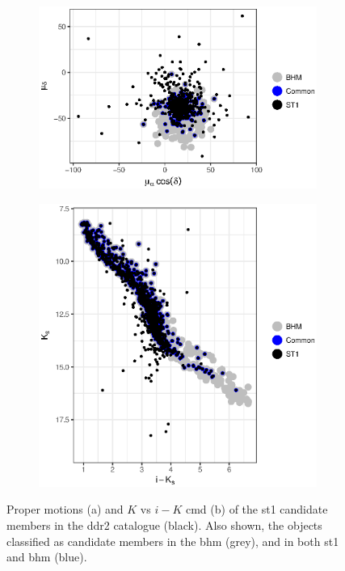 \begin{figure}[ht!]
    \centering
    \begin{subfigure}[t]{0.45\textwidth}
    \centering
       \includegraphics[width=\textwidth]{background/Figures/ST1_pm.eps}
        \caption{}
    \end{subfigure}
    \begin{subfigure}[t]{0.45\textwidth}
    \centering
     \includegraphics[width=\textwidth]{background/Figures/ST1_ph.eps}
        \caption{}
    \end{subfigure}
\caption{Proper motions (a) and $K$ vs $i-K$ \gls{cmd} (b) of the \gls{st1} candidate members in the \gls{ddr2} catalogue (black). Also shown, the objects classified as candidate members  in the \gls{bhm} (grey), and in both \gls{st1} and \gls{bhm} (blue).}
\label{fig:ST1}
\end{figure}

